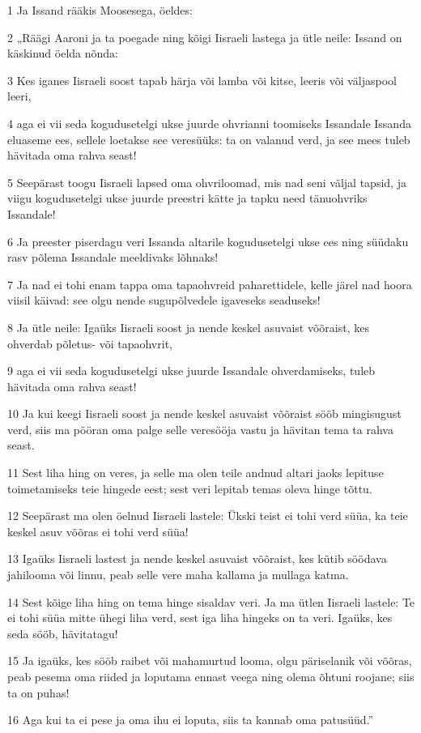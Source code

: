 \par 1 Ja Issand rääkis Moosesega, öeldes:
\par 2 „Räägi Aaroni ja ta poegade ning kõigi Iisraeli lastega ja ütle neile: Issand on käskinud öelda nõnda:
\par 3 Kes iganes Iisraeli soost tapab härja või lamba või kitse, leeris või väljaspool leeri,
\par 4 aga ei vii seda kogudusetelgi ukse juurde ohvrianni toomiseks Issandale Issanda eluaseme ees, sellele loetakse see veresüüks: ta on valanud verd, ja see mees tuleb hävitada oma rahva seast!
\par 5 Seepärast toogu Iisraeli lapsed oma ohvriloomad, mis nad seni väljal tapsid, ja viigu kogudusetelgi ukse juurde preestri kätte ja tapku need tänuohvriks Issandale!
\par 6 Ja preester piserdagu veri Issanda altarile kogudusetelgi ukse ees ning süüdaku rasv põlema Issandale meeldivaks lõhnaks!
\par 7 Ja nad ei tohi enam tappa oma tapaohvreid paharettidele, kelle järel nad hoora viisil käivad: see olgu nende sugupõlvedele igaveseks seaduseks!
\par 8 Ja ütle neile: Igaüks Iisraeli soost ja nende keskel asuvaist võõraist, kes ohverdab põletus- või tapaohvrit,
\par 9 aga ei vii seda kogudusetelgi ukse juurde Issandale ohverdamiseks, tuleb hävitada oma rahva seast!
\par 10 Ja kui keegi Iisraeli soost ja nende keskel asuvaist võõraist sööb mingisugust verd, siis ma pööran oma palge selle veresööja vastu ja hävitan tema ta rahva seast.
\par 11 Sest liha hing on veres, ja selle ma olen teile andnud altari jaoks lepituse toimetamiseks teie hingede eest; sest veri lepitab temas oleva hinge tõttu.
\par 12 Seepärast ma olen öelnud Iisraeli lastele: Ükski teist ei tohi verd süüa, ka teie keskel asuv võõras ei tohi verd süüa!
\par 13 Igaüks Iisraeli lastest ja nende keskel asuvaist võõraist, kes kütib söödava jahilooma või linnu, peab selle vere maha kallama ja mullaga katma.
\par 14 Sest kõige liha hing on tema hinge sisaldav veri. Ja ma ütlen Iisraeli lastele: Te ei tohi süüa mitte ühegi liha verd, sest iga liha hingeks on ta veri. Igaüks, kes seda sööb, hävitatagu!
\par 15 Ja igaüks, kes sööb raibet või mahamurtud looma, olgu päriselanik või võõras, peab pesema oma riided ja loputama ennast veega ning olema õhtuni roojane; siis ta on puhas!
\par 16 Aga kui ta ei pese ja oma ihu ei loputa, siis ta kannab oma patusüüd.”

